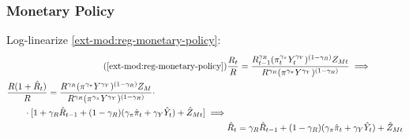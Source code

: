\documentclass[../thesis.tex]{subfiles}
\begin{document}

\begin{comment}
	



\begin{tcolorbox}[colback=red!5!white,colframe=red!75!black]
	
	\subsubsection*{Capital and Labor Levels}
	
	Subtract \ref{ext-mod:reg-ll-int-good-firm-TMRS} of one region from the other:
	\begin{align}
		(\hat{K}_{1t} - \hat{L}_{1t}) - (\hat{K}_{2t} - \hat{L}_{2t}) &= (\hat{W}_{\eta t} - \hat{R}_{K t}) - (\hat{W}_{\eta t} - \hat{R}_{K t}) \implies \nonumber \\
		\hat{K}_{1t} - \hat{L}_{1t} &= \hat{K}_{2t} - \hat{L}_{2t} \label{ext-mod:reg-ll-int-good-firm-TMRS-b}
	\end{align}
	
\end{tcolorbox}


	
	
\end{comment}




\subsubsection*{Monetary Policy}

Log-linearize \ref{ext-mod:reg-monetary-policy}:
\begin{align}
	\tag{\ref{ext-mod:reg-monetary-policy}}
	& \frac{R_{t}}{R} = \frac{R_{t-1}^{\gamma_{R}} (\pi_t^{\gamma_{\pi}} Y_{t}^{\gamma_{Y}})^{(1-\gamma_{R})} Z_{Mt}}{R^{\gamma_{R}} (\pi^{\gamma_{\pi}} Y^{\gamma_{Y}})^{(1-\gamma_{R})}} \implies \\
	\begin{split}
		& \frac{R(1+ \hat{R}_t)}{R} = \frac{ R^{\gamma_{R}} (\pi^{\gamma_{\pi}} Y^{\gamma_{Y}})^{(1-\gamma_{R})} Z_{M}}{R^{\gamma_{R}} (\pi^{\gamma_{\pi}} Y^{\gamma_{Y}})^{(1-\gamma_{R})}} \cdot \\
		& \qquad \cdot [1+ \gamma_{R} \hat{R}_{t-1} + (1-\gamma_{R})(\gamma_{\pi} \hat{\pi}_t + \gamma_{Y} \hat{Y}_t) + \hat{Z}_{Mt}] \implies
	\end{split} \nonumber \\
	& \hat{R}_t = \gamma_{R} \hat{R}_{t-1} + (1-\gamma_{R})(\gamma_{\pi} \hat{\pi}_t + \gamma_{Y} \hat{Y}_t) + \hat{Z}_{Mt} \label{ext-mod:reg-ll-monetary-policy}
\end{align}
\end{document}
